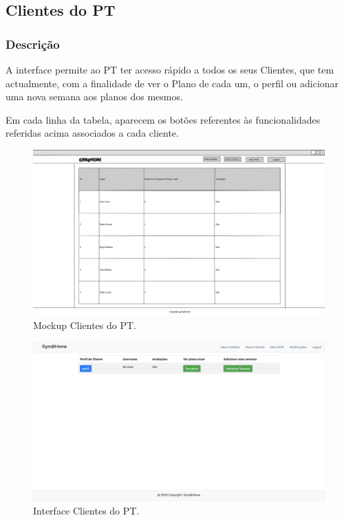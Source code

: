 \subsection{Clientes do PT}
\label{subsec:clientes}
\subsubsection{Descrição}
\hspace{5mm} A interface permite ao PT ter acesso rápido a todos os seus Clientes, que tem actualmente, com a finalidade de ver o Plano de cada um, o perfil ou adicionar uma nova semana aos planos dos mesmos.

\hspace{5mm} Em cada linha da tabela, aparecem os botões referentes às funcionalidades referidas acima associados a cada cliente.

\begin{figure}[H]
    \centering
    \includegraphics[scale=0.25]{images/mockups/personal_trainer_listar_clientes.png}
    \caption{Mockup Clientes do PT.}
    \label{fig:mockupclientes}
\end{figure}

\begin{figure}[H]
    \centering
    \includegraphics[scale=0.25]{images/interfaces/pt_meus_clientes.png}
    \caption{Interface Clientes do PT.}
    \label{fig:interfaceclientes}
\end{figure}

